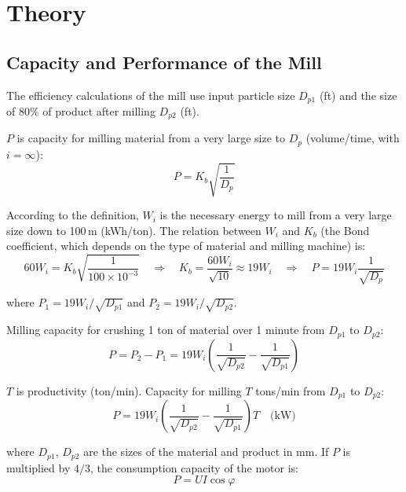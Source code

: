 \section{Theory}

\subsection{Capacity and Performance of the Mill}

The efficiency calculations of the mill use input particle size $D_{p1}$ (ft) and the size of 80\% of product after milling $D_{p2}$ (ft).

$P$ is capacity for milling material from a very large size to $D_p$ (volume/time, with $i = \infty$):
\begin{equation}
    P = K_b \sqrt{\frac{1}{D_p}}
\end{equation}

According to the definition, $W_i$ is the necessary energy to mill from a very large size down to 100\,\textmu m (kWh/ton). The relation between $W_i$ and $K_b$ (the Bond coefficient, which depends on the type of material and milling machine) is:
\begin{equation}
    60W_i = K_b \sqrt{\frac{1}{100 \times 10^{-3}}}
    \quad \Rightarrow \quad
    K_b = \frac{60W_i}{\sqrt{10}} \approx 19W_i
    \quad \Rightarrow \quad
    P = 19W_i \frac{1}{\sqrt{D_p}}
\end{equation}

where $P_1 = 19W_i / \sqrt{D_{p1}}$ and $P_2 = 19W_i / \sqrt{D_{p2}}$.

Milling capacity for crushing 1 ton of material over 1 minute from $D_{p1}$ to $D_{p2}$:
\begin{equation}
    P = P_2 - P_1 = 19W_i \left(\frac{1}{\sqrt{D_{p2}}} - \frac{1}{\sqrt{D_{p1}}}\right)
\end{equation}

$T$ is productivity (ton/min). Capacity for milling $T$ tons/min from $D_{p1}$ to $D_{p2}$:
\begin{equation}
    P = 19W_i \left(\frac{1}{\sqrt{D_{p2}}} - \frac{1}{\sqrt{D_{p1}}}\right) T \quad \text{(kW)}
\end{equation}

where $D_{p1}$, $D_{p2}$ are the sizes of the material and product in mm. If $P$ is multiplied by $4/3$, the consumption capacity of the motor is:
\begin{equation}
    P = UI\cos\varphi
\end{equation}

